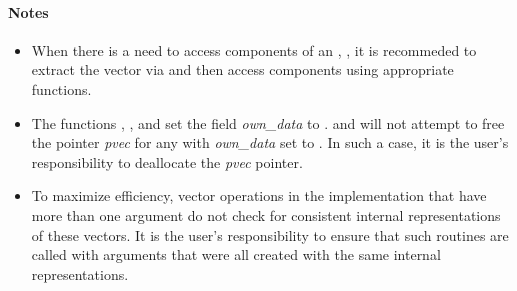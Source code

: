 \paragraph{\bf Notes} 
           
\begin{itemize}
                                        
\item
  When there is a need to access components of an , , 
  it is recommeded to extract the {\petsc} vector via       
   and then access components using 
  appropriate {\petsc} functions.        
                                                               
\item
  {\warn}The functions , , and
   set the field {\em own\_data} to .   
   and 
  will not attempt to free the pointer {\em pvec} for any  with
  {\em own\_data} set to . In such a case, it is the user's responsibility to
  deallocate the {\em pvec} pointer.

\item
  {\warn}To maximize efficiency, vector operations in the {\nvecpetsc} implementation
  that have more than one  argument do not check for
  consistent internal representations of these vectors. It is the user's 
  responsibility to ensure that such routines are called with 
  arguments that were all created with the same internal representations.

\end{itemize}

